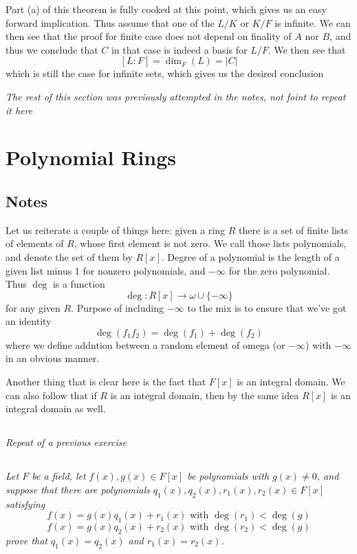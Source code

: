 \documentclass[11pt,oneside,titlepage]{book}
\newcommand{\set}[1]{\{ #1 \}}
\begin{document}
Part (a) of this theorem is fully cooked at this point, which gives us
an easy forward implication. Thus assume that one of the $L/K$ or $K/F$
is infinite. We can then see that the proof for finite case does not
depend on finality of $A$ nor $B$, and thus we conclude that $C$
in that case is indeed a basis for $L/F$. We then see that
$$[L:F] = \dim_F(L) = |C|$$
which is still the case for infinite sets, which gives us the desired
conclusion

\textit{The rest of this section was previously attempted in the notes,
not foint to repeat it here}

\section{Polynomial Rings}

\subsection*{Notes}

Let us reiterate a couple of things here: given a ring $R$ there is a
set of finite lists of elements of $R$, whose first element is not
zero. We call those lists polynomials, and denote the set of
them by $R[x]$. Degree of a polynomial is the length of a given list
minus 1 for nonzero polynomials, and $-\infty$ for the zero
polynomial. Thus $\deg$ is a function
$$\deg: R[x] \to \omega \cup \set{-\infty}$$
for any given $R$. Purpose of including $-\infty$ to the mix is to
ensure that we've got an identity
$$\deg(f_1 f_2) = \deg(f_1) + \deg(f_2)$$
where we define addntion between a random element of omega (or
$-\infty$) with $-\infty$ in an obvious manner.

Another thing that is clear here is the fact that $F[x]$ is an
integral domain. We can also follow that if $R$ is an integral domain,
then by the same idea $R[x]$ is an integral domain as well. 

\subsection{}

\textit{Repeat of a previous exercise}

\subsection{}

\textit{Let $F$ be a field, let $f(x), g(x) \in F[x]$ be polynomials
with $g(x) \neq 0$, and suppose that there are polynomials $q_1(x),
q_2(x), r_1(x), r_2(x) \in F[x]$ satisfying
$$f(x) = g(x) q_1(x) + r_1(x)\text{ with } \deg(r_1) < \deg(g)$$
$$f(x) = g(x) q_2(x) + r_2(x)\text{ with } \deg(r_2) < \deg(g)$$
prove that $q_1(x) = q_2(x)$ and $r_1(x) = r_2(x)$. }
\end{document}
